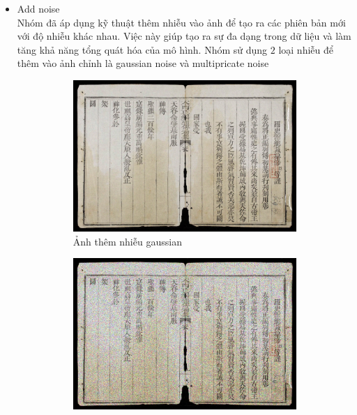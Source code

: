 \documentclass[a4paper,12pt]{article}
\begin{document}
\begin{itemize}
    \item Add noise
    \\Nhóm đã áp dụng kỹ thuật thêm nhiễu vào ảnh để tạo ra các phiên bản mới với độ nhiễu khác nhau. Việc này giúp tạo ra sự đa dạng trong dữ liệu và làm tăng khả năng tổng quát hóa của mô hình.
    Nhóm sử dụng $2$ loại nhiễu để thêm vào ảnh chỉnh là gaussian noise và multipricate noise
    \begin{figure}[H]
        \centering
        \begin{subfigure}{.4\textwidth}
          \includegraphics[width=1\linewidth]{images/gaussian_img.png}
          \caption{Ảnh thêm nhiễu gaussian}
        \end{subfigure}
        \hspace{20mm}
        \begin{subfigure}{.4\textwidth}
          \includegraphics[width=1\linewidth]{images/multipricate_img.png}

\end{subfigure}
\end{figure}
\end{itemize}
\end{document}
